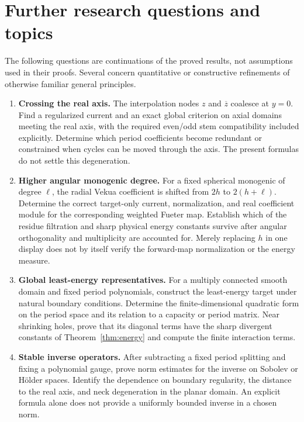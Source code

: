 \documentclass[11pt,a4paper]{article}
\numberwithin{equation}{section}
\theoremstyle{definition}
\theoremstyle{remark}
\newcommand{\barz}{\overline z}
\begin{document}
\section{Further research questions and topics}
\label{sec:future}

The following questions are continuations of the proved results, not assumptions
used in their proofs. Several concern quantitative or constructive refinements
of otherwise familiar general principles.

\begin{enumerate}[label=\textbf{\arabic*.},leftmargin=2em,itemsep=7pt]
\item \textbf{Crossing the real axis.}
The interpolation nodes $z$ and $\barz$ coalesce at $y=0$. Find a regularized
current and an exact global criterion on axial domains meeting the real axis,
with the required even/odd stem compatibility included explicitly. Determine
which period coefficients become redundant or constrained when cycles can be
moved through the axis. The present formulas do not settle this degeneration.

\item \textbf{Higher angular monogenic degree.}
For a fixed spherical monogenic of degree $\ell$, the radial Vekua coefficient
is shifted from $2h$ to $2(h+\ell)$. Determine the correct target-only current,
normalization, and real coefficient module for the corresponding weighted
Fueter map. Establish which of the residue filtration and sharp physical
energy constants survive after angular orthogonality and multiplicity are
accounted for. Merely replacing $h$ in one display does not by itself verify
the forward-map normalization or the energy measure.

\item \textbf{Global least-energy representatives.}
For a multiply connected smooth domain and fixed period polynomials, construct
the least-energy target under natural boundary conditions. Determine the
finite-dimensional quadratic form on the period space and its relation to a
capacity or period matrix. Near shrinking holes, prove that its diagonal
terms have the sharp divergent constants of Theorem~\ref{thm:energy} and
compute the finite interaction terms.

\item \textbf{Stable inverse operators.}
After subtracting a fixed period splitting and fixing a polynomial gauge,
prove norm estimates for the inverse on Sobolev or H\"older spaces. Identify
the dependence on boundary regularity, the distance to the real axis, and
neck degeneration in the planar domain. An explicit formula alone does not
provide a uniformly bounded inverse in a chosen norm.


\end{enumerate}
\end{document}
